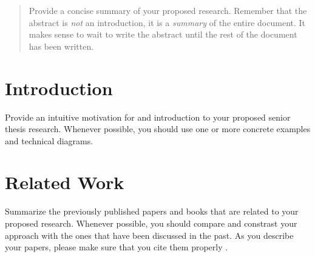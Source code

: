 \documentclass[11pt]{article}
\begin{document}

\begin{quote}
Provide a concise summary of your proposed research. Remember that
the abstract is {\it not} an introduction, it is a {\it summary} of the
entire document. It makes sense to wait to write the abstract until the
rest of the document has been written.
\end{quote}

\section{Introduction}
\label{sec:introduction}
\vspace*{-.1in}


Provide an intuitive motivation for and introduction to your proposed
senior thesis research.  Whenever possible, you should use one or more
concrete examples and technical diagrams.

\vspace*{-.1in}
\section{Related Work}
\label{sec:relatedwork}
\vspace*{-.1in}


Summarize the previously published papers and books that are related
to your proposed research.  Whenever possible, you should compare and
constrast your approach with the ones that have been discussed in the
past.  As you describe your papers, please make sure that you cite
them properly \cite{conrad-gecco-selection-study}.

\vspace*{-.2in}
\end{document}
